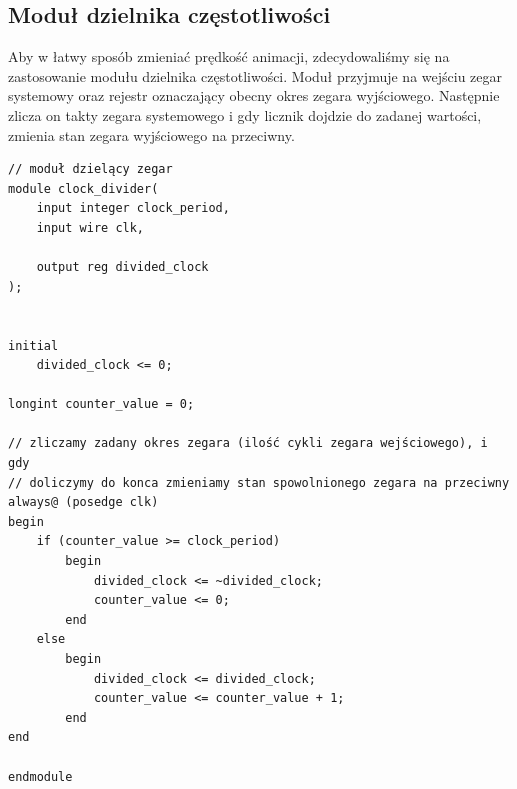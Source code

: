\documentclass[a4paper]{article}
\begin{document}
\subsection{Moduł dzielnika częstotliwości}
Aby w łatwy sposób zmieniać prędkość animacji, zdecydowaliśmy się na zastosowanie modułu dzielnika częstotliwości.
Moduł przyjmuje na wejściu zegar systemowy oraz rejestr oznaczający obecny okres
zegara wyjściowego. Następnie zlicza on takty zegara systemowego i gdy licznik dojdzie
do zadanej wartości, zmienia stan zegara wyjściowego na przeciwny.
\begin{verbatim}
// moduł dzielący zegar
module clock_divider(
    input integer clock_period,
    input wire clk,
    
    output reg divided_clock
);


initial
    divided_clock <= 0;

longint counter_value = 0;

// zliczamy zadany okres zegara (ilość cykli zegara wejściowego), i gdy 
// doliczymy do konca zmieniamy stan spowolnionego zegara na przeciwny
always@ (posedge clk)
begin 
    if (counter_value >= clock_period) 
        begin
            divided_clock <= ~divided_clock;
            counter_value <= 0;
        end
    else 
        begin
            divided_clock <= divided_clock;
            counter_value <= counter_value + 1;
        end
end

endmodule
\end{verbatim}
\end{document}
